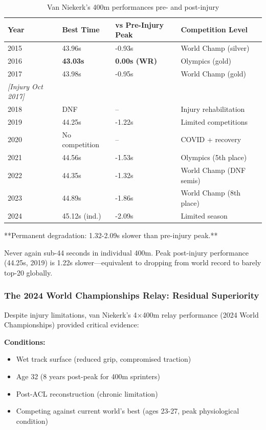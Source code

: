 \begin{table}[H]
\centering
\caption{Van Niekerk's 400m performances pre- and post-injury}
\begin{tabular}{@{}llll@{}}
\toprule
\textbf{Year} & \textbf{Best Time} & \textbf{vs Pre-Injury Peak} & \textbf{Competition Level} \\
\midrule
2015 & 43.96s & -0.93s & World Champ (silver) \\
2016 & \textbf{43.03s} & \textbf{0.00s (WR)} & Olympics (gold) \\
2017 & 43.98s & -0.95s & World Champ (gold) \\
\midrule
\textit{[Injury Oct 2017]} & & & \\
\midrule
2018 & DNF & -- & Injury rehabilitation \\
2019 & 44.25s & -1.22s & Limited competitions \\
2020 & No competition & -- & COVID + recovery \\
2021 & 44.56s & -1.53s & Olympics (5th place) \\
2022 & 44.35s & -1.32s & World Champ (DNF semis) \\
2023 & 44.89s & -1.86s & World Champ (8th place) \\
2024 & 45.12s (ind.) & -2.09s & Limited season \\
\bottomrule
\end{tabular}
\end{table}

**Permanent degradation: 1.32-2.09s slower than pre-injury peak.**

Never again sub-44 seconds in individual 400m. Peak post-injury performance (44.25s, 2019) is 1.22s slower—equivalent to dropping from world record to barely top-20 globally.

\subsubsection{The 2024 World Championships Relay: Residual Superiority}

Despite injury limitations, van Niekerk's 4×400m relay performance (2024 World Championships) provided critical evidence:

\textbf{Conditions:}
\begin{itemize}
    \item Wet track surface (reduced grip, compromised traction)
    \item Age 32 (8 years post-peak for 400m sprinters)
    \item Post-ACL reconstruction (chronic limitation)
    \item Competing against current world's best (ages 23-27, peak physiological condition)
\end{itemize}

